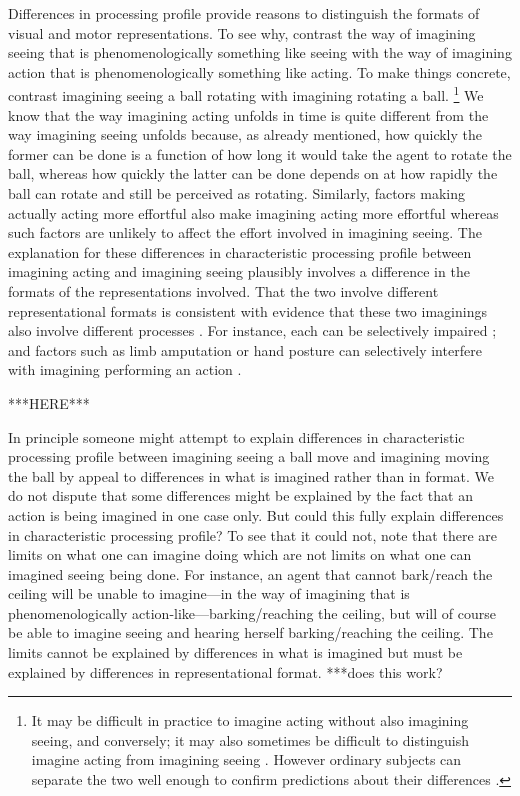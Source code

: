 \documentclass[12pt,\papersize]{extarticle}
\begin{document}
Differences in processing profile provide reasons to distinguish the formats of visual and motor representations. To see why, contrast the way of imagining seeing that is phenomenologically something like seeing with the way of imagining action that is phenomenologically something like acting. To make things concrete, contrast imagining seeing a ball rotating with imagining rotating a ball.%
\footnote{It may be difficult in practice to imagine acting without also imagining seeing, and conversely; it may also sometimes be difficult to distinguish imagine acting from imagining seeing \citep[as][p.\ 170 note]{currie:1997_mental}. However ordinary subjects can separate the two well enough to confirm predictions about their differences \citep[see, e.g.,][]{kosslyn:2001_imagining}.
}
We know that the way imagining acting unfolds in time is quite different from the way imagining seeing unfolds because, as already mentioned, how quickly the former can be done is a function of how long it would take the agent to rotate the ball, whereas how quickly the latter can be done depends on at how rapidly the ball can rotate and still be perceived as rotating. Similarly, factors making actually acting more effortful also make imagining acting more effortful whereas such factors are unlikely to affect the effort involved in imagining seeing. The explanation for these differences in characteristic processing profile between imagining acting and imagining seeing plausibly involves a difference in the formats of the representations involved. That the two involve different representational formats is consistent with  evidence that these two imaginings also involve different processes \citep{kosslyn:2001_imagining}. For instance, each can be selectively impaired \citep{sirigu:2011_motor}; and factors such as limb amputation or hand posture can selectively interfere with imagining performing an action \citep{nico:2004_left, vargas:2004s_influence,  fourkas:2006_influence}. 

***HERE***

In principle someone might attempt to explain differences in characteristic processing profile between imagining seeing a ball move and imagining moving the ball by appeal to differences in what is imagined rather than in format. We do not dispute that some differences might be explained by the fact that an action is being imagined in one case only.  But could this fully explain differences in characteristic processing profile?  To see that it could not, note that there are limits on what one can imagine doing which are not limits on what one can imagined seeing being done.  For instance, an agent that cannot bark/reach the ceiling will be unable to imagine---in the way of imagining that is phenomenologically action-like---barking/reaching the ceiling, but will of course be able to imagine seeing and hearing herself barking/reaching the ceiling.  The limits cannot be explained by differences in what is imagined but must be explained by differences in representational format.  ***does this work?
\end{document}
